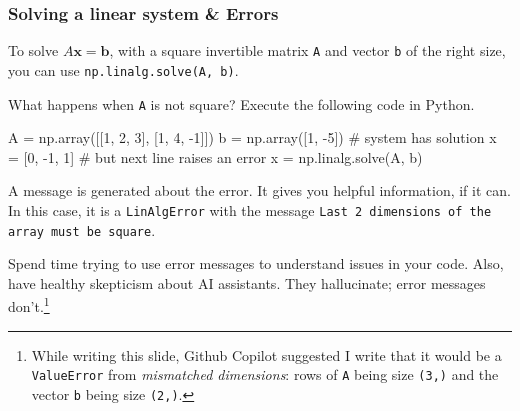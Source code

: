 \documentclass{beamer}
\newenvironment{codeblock}
    {\hfill\begin{beamerboxesrounded}[lower=codecol, width=0.8\textwidth]
    \medskip

    }
    { 
    \end{beamerboxesrounded}\hfill
    }
\theoremstyle{example}
\newcommand{\ttt}[1]{{\small\texttt{#1}}}
\begin{document}
\begin{frame}[fragile]
\frametitle{Solving a linear system \& Errors}
To solve $A\mathbf{x} = \mathbf{b}$, with a square invertible matrix \ttt{A} and vector \ttt{b} of the right size, you can use \ttt{np.linalg.solve(A, b)}.

\pause
What happens when \ttt{A} is not square? Execute the following code in Python.

\begin{codeblock}

\begin{python}
    A = np.array([[1, 2, 3], [1, 4, -1]])
    b = np.array([1, -5])
    # system has solution x = [0, -1, 1]
    # but next line raises an error
    x = np.linalg.solve(A, b)
\end{python}

\end{codeblock}

\pause
A message is generated about the error. It gives you helpful information, if it can. In this case, it is a \ttt{LinAlgError} with the message \ttt{Last 2 dimensions of the array must be square}.

\pause
Spend time trying to use error messages to understand issues in your code. Also, have healthy skepticism about AI assistants. They hallucinate; error messages don't.\footnote{While writing this slide, Github Copilot suggested I write that it would be a \ttt{ValueError} from \emph{mismatched dimensions}: rows of \ttt{A} being size \ttt{(3,)} and the vector \ttt{b} being size \ttt{(2,)}.}
\end{frame}
\end{document}
